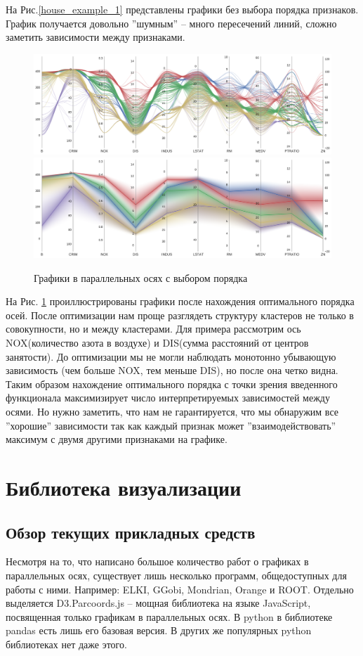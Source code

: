\documentclass[12pt,fleqn]{article}
\begin{document}
На Рис.\ref{house_example_1} представлены графики без выбора порядка признаков. График получается
довольно ''шумным'' -- много пересечений линий, сложно заметить зависимости между признаками.


\begin{figure}[htb]
    \centering
    \includegraphics[width=15cm]{housing_example_4.pdf}\\
    \includegraphics[width=15cm]{housing_example_5.pdf}
    \caption{Графики в параллельных осях с выбором порядка}
    \label{house_example_2}
\end{figure}

На Рис. \ref{house_example_2} проиллюстрированы графики после нахождения оптимального порядка осей.
После оптимизации нам проще разглядеть структуру кластеров не только в совокупности, но и между кластерами. 
Для примера рассмотрим ось NOX(количество азота в воздухе) и DIS(сумма расстояний от центров занятости). До оптимизации
мы не могли наблюдать монотонно убывающую зависимость (чем больше NOX, тем меньше DIS), но после она четко видна.
Таким образом нахождение оптимального порядка с точки зрения введенного функционала максимизирует 
число интерпретируемых зависимостей между осями. Но нужно заметить, что нам не гарантируется, что мы обнаружим все ''хорошие'' зависимости так как
каждый признак может ''взаимодействовать'' максимум с двумя другими признаками на графике.


\section{Библиотека визуализации}
\subsection{Обзор текущих прикладных средств}
Несмотря на то, что написано большое количество работ о графиках в параллельных осях, 
существует лишь несколько программ, общедоступных для работы с ними.
Например: ELKI, GGobi, Mondrian, Orange и ROOT. Отдельно выделяется D3.Parcoords.js -- 
мощная библиотека на языке JavaScript, посвященная только графикам в параллельных осях.
В python в библиотеке pandas есть лишь его базовая версия. В других же популярных
python библиотеках нет даже этого.
\end{document}

